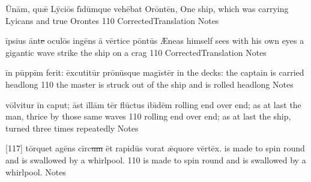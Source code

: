 \latline
  {\={\macron U}n\=am, qu\={\ae} L\=yci\={\macron o}s f\={\macron \i}d\=umqu\-e v\-eh\={\macron e}b\-at \-Or\=ont\={\macron e}n,}
  { One ship, which was carrying Lyicans and true Orontes }
  {110}
  { CorrectedTranslation }
  { Notes }


\latline
  {\=ips\-i\-us \=ant\sout{e }\-oc\-ul\={\macron o}s ing\={\macron e}ns \={\macron a} v\=ert\-ic\-e p\=ont\=us}
  { {\AE}neas himself sees with his own eyes a gigantic wave strike the ship on a crag  }
  {110}
  { CorrectedTranslation }
  { Notes }


\latline
  {\=in p\=upp\=im fe\-r\-it:  \=exc\-ut\-it\=ur pr\={\macron o}n\=usqu\-e m\-ag\=ist\=er}
  { in the decks: the captain is carried headlong }
  {110}
  { the master is struck out of the ship and is rolled headlong }
  { Notes }




\latline
  {v\=olv\-it\-ur \=in c\-ap\-ut; \=ast \=ill\=am t\=er fl\={\macron u}ct\-us \-ib\={\macron \i}d\=em}
  { rolling end over end; as at last the man, thrice by those same waves  }
  {110}
  { rolling end over end; as at last the ship,  turned three times repeatedly }
  { Notes }


\latline
  {[117] t\=orqu\-et \-ag\={\macron e}ns c\=irc\sout{um }\=et r\-ap\-id\=us v\-or\-at \={\ae}qu\-or\-e v\=ert\=ex.}
  { is made to spin round and is swallowed by a whirlpool. }
  {110}
  { is made to spin round and is swallowed by a whirlpool. }
  { Notes }

